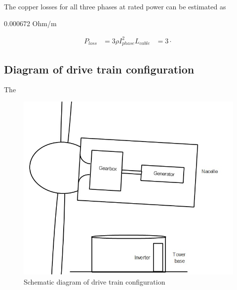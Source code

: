 The copper losses for all three phases at rated power can be estimated as

0.000672 Ohm/m

\begin{align}
    P_{loss} &= 3 \rho I_{phase}^2 L_{cable}
    &= 3 \cdot
\end{align}

\subsection{Diagram of drive train configuration}

The

\begin{figure}[H]
    \centering
    \includegraphics[width=1\textwidth]{Images/Drive_train_sketch.jpg}
    \caption{Schematic diagram of drive train configuration}
    \label{fig:eddie's art}
\end{figure}


